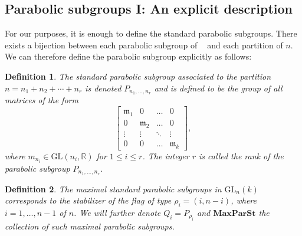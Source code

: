 \documentclass[12pt]{article} %
\newtheorem{definition}{Definition}[section]
\DeclareMathOperator{\SLn}{\text{SL}_n(\mathbb{R})}
\begin{document}
\subsection{Parabolic subgroups I: An explicit description }
For our purposes, it is enough to define the standard parabolic subgroups.  There exists a bijection between each parabolic subgroup of $\SLn$
and each partition of $n$. We can therefore define the parabolic subgroup explicitly as follows:
\begin{definition}
    The standard parabolic subgroup associated to the partition $n = n_1 + n_2 + \cdots + n_r$ is denoted $P_{n_1,\ldots,n_r}$ and is defined to be the group of all matrices of the form
    \[
        \begin{bmatrix}
            \mathfrak{m}_1 & 0              & \ldots & 0              \\
            0              & \mathfrak{m}_2 & \ldots & 0              \\
            \vdots         & \vdots         & \ddots & \vdots         \\
            0              & 0              & \ldots & \mathfrak{m}_k
        \end{bmatrix} ,
    \]
    where $m_{n_i} \in \mathrm{GL}(n_i, \mathbb{R})$ for $1 \leq i \leq r$. The integer $r$ is called the rank of the parabolic subgroup $P_{n_1,\ldots,n_r}$.
\end{definition}

\begin{definition}
    The maximal standard parabolic subgroups in $\text{GL}_n(k)$ corresponds to the
    stabilizer of the flag of type $\rho_i =(i,n-i)$, where $i = 1,\ldots,n-1$ of $n$. We will
    further denote $Q_i = P_{\rho_i}$ and $\textbf{MaxParSt}$ the collection of such maximal parabolic subgroups.
\end{definition}
\end{document}
